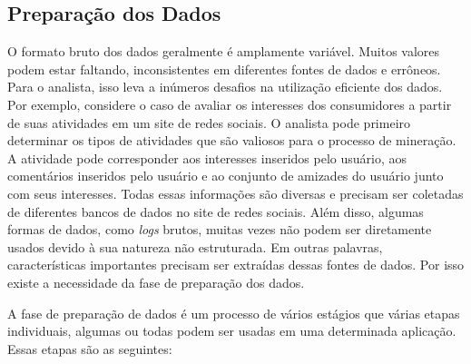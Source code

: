 \subsection{Preparação dos Dados}
O formato bruto dos dados geralmente é amplamente variável. Muitos valores podem estar faltando, inconsistentes em diferentes fontes de dados e errôneos. Para o analista, isso leva a inúmeros desafios na utilização eficiente dos dados. Por exemplo, considere o caso de avaliar os interesses dos consumidores a partir de suas atividades em um site de redes sociais. O analista pode primeiro determinar os tipos de atividades que são valiosos para o processo de mineração. A atividade pode corresponder aos interesses inseridos pelo usuário, aos comentários inseridos pelo usuário e ao conjunto de amizades do usuário junto com seus interesses. Todas essas informações são diversas e precisam ser coletadas de diferentes bancos de dados no site de redes sociais. Além disso, algumas formas de dados, como \textit{logs} brutos, muitas vezes não podem ser diretamente usados devido à sua natureza não estruturada. Em outras palavras, características importantes precisam ser extraídas dessas fontes de dados. Por isso existe a necessidade da fase de preparação dos dados.

A fase de preparação de dados é um processo de vários estágios que  várias etapas individuais, algumas ou todas podem ser usadas em uma determinada aplicação. Essas etapas são as seguintes:

